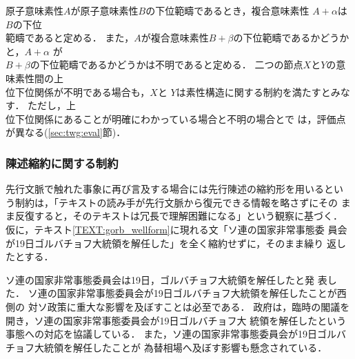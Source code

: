 原子意味素性$A$が原子意味素性$B$の下位範疇であるとき，複合意味素性
$A+\alpha$は$B$の下位\\範疇であると定める．
また，$A$が複合意味素性$B+\beta$の下位範疇であるかどうかと，$A+\alpha$
が\\$B+\beta$の下位範疇であるかどうかは不明であると定める．
二つの節点$X$と$Y$の意味素性間の上\\位下位関係が不明である場合も，\hspace*{-0.3mm}$X$と
$Y$は素性構造に関する制約を満たすとみなす．
\hspace*{-0.3mm}ただし，\hspace*{-0.3mm}上\\位下位関係にあることが明確にわかっている場合と不明の場合とで
は，評価点が異なる(\ref{sec:twg:eval}節)．

\subsubsection{陳述縮約に関する制約}
\label{sec:twg:corref:cor}

先行文脈で触れた事象に再び言及する場合には先行陳述の縮約形を用いるとい
う制約は，「テキストの読み手が先行文脈から復元できる情報を略さずにその
まま反復すると，そのテキストは冗長で理解困難になる」という観察に基づく．
仮に，テキスト\ref{TEXT:gorb_wellform}に現れる文「ソ連の国家非常事態委
員会が19日ゴルバチョフ大統領を解任した」を全く縮約せずに，そのまま繰り
返したとする．
\begin{TEXT}
\text ソ連の国家非常事態委員会は19日，ゴルバチョフ大統領を解任したと発
表した．
ソ連の国家非常事態委員会が19日ゴルバチョフ大統領を解任したことが西側の
対ソ政策に重大な影響を及ぼすことは必至である． 
政府は，臨時の閣議を開き，ソ連の国家非常事態委員会が19日ゴルバチョフ大
統領を解任したという事態への対応を協議している．
また，ソ連の国家非常事態委員会が19日ゴルバチョフ大統領を解任したことが
為替相場へ及ぼす影響も懸念されている．\label{TEXT:gorb_illform}
\end{TEXT}

